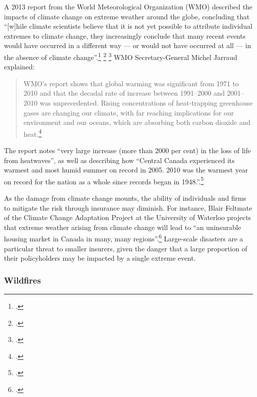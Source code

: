 A 2013 report from the World Meteorological Organization (WMO) described the impacts of climate change on extreme weather around the globe, concluding that ``[w]hile climate scientists believe that it is not yet possible to attribute individual extremes to climate change, they increasingly conclude that many recent events would have occurred in a different way --- or would not have occurred at all --- in the absence of climate change''.\footcite[][p. 15]{WMOExtremesReport} \footcite[See also: ][]{BBConWMO} \footcite[][]{ReutersonWMO}
WMO Secretary-General Michel Jarraud explained:
\begin{quote}
WMO's report shows that global warming was significant from 1971 to 2010 and that the decadal rate of increase between 1991--2000 and 2001--2010 was unprecedented.  Rising concentrations of heat-trapping greenhouse gases are changing our climate, with far reaching implications for our environment and our oceans, which are absorbing both carbon dioxide and heat.\footcite[][]{WMOExtremesPR}
\end{quote}
The report notes ``very large increase (more than 2000 per cent) in the loss of life from heatwaves'', as well as describing how ``Central Canada experienced its warmest and most humid summer on record in 2005. 2010 was the warmest year on record for the nation as a whole since records began in 1948.''.\footcite[][p. 6, 8]{WMOExtremesReport}



As the damage from climate change mounts, the ability of individuals and firms to mitigate the risk through insurance may diminish.
For instance, Blair Feltmate of the Climate Change Adaptation Project at the University of Waterloo projects that extreme weather arising from climate change will lead to ``an uninsurable housing market in Canada in many, many regions''.\footcite[][]{GMUninsurable}
Large-scale disasters are a particular threat to smaller insurers, given the danger that a large proportion of their policyholders may be impacted by a single extreme event.



	\subsubsection{Wildfires}
	



